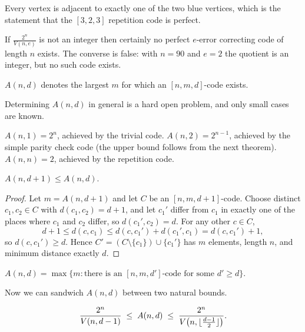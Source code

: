 \documentclass[a4paper]{scrartcl}
\DeclarePairedDelimiter{\floor}{\lfloor}{\rfloor}
\begin{document}
Every vertex is adjacent to exactly one of the two blue vertices, which is the statement that the $[3,2,3]$ repetition code is perfect.

\begin{remark}
	If $\frac{2^n}{V(n,e)}$ is not an integer then certainly no perfect $e$-error correcting code of length $n$ exists. The converse is false: with $n = 90$ and $e = 2$ the quotient is an integer, but no such code exists.
\end{remark}

\begin{definition}
	$A(n,d)$ denotes the largest $m$ for which an $[n,m,d]$-code exists.
\end{definition}

Determining $A(n,d)$ in general is a hard open problem, and only small cases are known.

\begin{example}
	$A(n,1) = 2^n$, achieved by the trivial code. $A(n,2) = 2^{n-1}$, achieved by the simple parity check code (the upper bound follows from the next theorem). $A(n,n) = 2$, achieved by the repetition code.
\end{example}

\begin{lemma}\label{lem:Amono}
	$A(n,d+1) \le A(n,d)$.
\end{lemma}

\begin{proof}
	Let $m = A(n,d+1)$ and let $C$ be an $[n,m,d+1]$-code. Choose distinct $c_1, c_2 \in C$ with $d(c_1,c_2) = d+1$, and let $c_1'$ differ from $c_1$ in exactly one of the places where $c_1$ and $c_2$ differ, so $d(c_1',c_2) = d$. For any other $c \in C$,
	$$d+1 \le d(c,c_1) \le d(c,c_1') + d(c_1',c_1) = d(c,c_1') + 1,$$
	so $d(c,c_1') \ge d$. Hence $C' = (C \setminus \{c_1\})\cup\{c_1'\}$ has $m$ elements, length $n$, and minimum distance exactly $d$.
\end{proof}

\begin{corollary}
	$A(n,d) = \max\{m : \text{there is an } [n,m,d'] \text{-code for some } d' \ge d\}$.
\end{corollary}

Now we can sandwich $A(n,d)$ between two natural bounds.

\begin{theorem}\label{thm:gsv}
	$$\frac{2^n}{V(n,d-1)} \;\le\; A(n,d) \;\le\; \frac{2^n}{V\bigl(n,\floor{\frac{d-1}{2}}\bigr)}.$$
\end{theorem}
\end{document}

